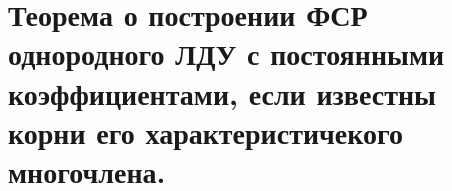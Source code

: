 {
	\section{Теорема о построении ФСР однородного ЛДУ с постоянными коэффициентами, если известны корни его
	характеристичекого многочлена.}

	\newpage
}